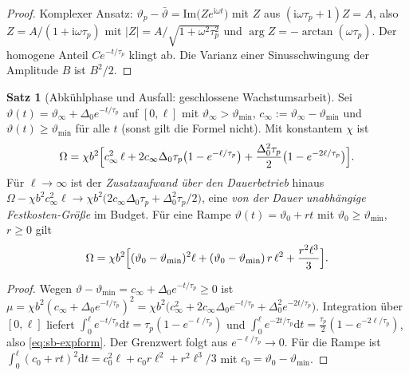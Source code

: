 \documentclass[a4paper, 12pt, twoside, openright]{report}
\theoremstyle{definition}
\theoremstyle{definition}
\newtheorem{satz}{Satz}[chapter]
\begin{document}
\begin{proof}
Komplexer Ansatz: $\vartheta_p-\bar\vartheta=\mathrm{Im}\bigl(Ze^{\mathrm i\omega t}\bigr)$ mit
$Z$ aus $(\mathrm i\omega\tau_p+1)Z=A$, also $Z=A/(1+\mathrm i\omega\tau_p)$ mit
$|Z|=A/\sqrt{1+\omega^2\tau_p^2}$ und $\arg Z=-\arctan(\omega\tau_p)$. Der homogene Anteil
$Ce^{-t/\tau_p}$ klingt ab. Die Varianz einer Sinusschwingung der Amplitude $B$ ist $B^2/2$.
\end{proof}

\begin{satz}[Abkühlphase und Ausfall: geschlossene Wachstumsarbeit]\label{satz:sb-exp}
Sei $\vartheta(t)=\vartheta_\infty+\Delta_0e^{-t/\tau_p}$ auf $[0,\ell]$ mit
$\vartheta_\infty>\vartheta_{\min}$, $c_\infty:=\vartheta_\infty-\vartheta_{\min}$ und
$\vartheta(t)\ge\vartheta_{\min}$ für alle $t$ (sonst gilt die Formel nicht). Mit konstantem
$\chi$ ist
\begin{equation}
  \Omega=\chi b^2\Bigl[c_\infty^2\,\ell+2c_\infty\Delta_0\tau_p\bigl(1-e^{-\ell/\tau_p}\bigr)
  +\frac{\Delta_0^2\tau_p}{2}\bigl(1-e^{-2\ell/\tau_p}\bigr)\Bigr].
  \label{eq:sb-expform}
\end{equation}
Für $\ell\to\infty$ ist der \emph{Zusatzaufwand über den Dauerbetrieb} hinaus
$\Omega-\chi b^2c_\infty^2\ell\to\chi b^2\bigl(2c_\infty\Delta_0\tau_p+\Delta_0^2\tau_p/2\bigr)$,
eine \emph{von der Dauer unabhängige Festkosten-Größe} im Budget. Für eine Rampe
$\vartheta(t)=\vartheta_0+rt$ mit $\vartheta_0\ge\vartheta_{\min}$, $r\ge0$ gilt
\begin{equation}
  \Omega=\chi b^2\Bigl[(\vartheta_0-\vartheta_{\min})^2\ell+(\vartheta_0-\vartheta_{\min})\,r\,\ell^2+\frac{r^2\ell^3}{3}\Bigr].
  \label{eq:sb-rampe}
\end{equation}
\end{satz}

\begin{proof}
Wegen $\vartheta-\vartheta_{\min}=c_\infty+\Delta_0e^{-t/\tau_p}\ge0$ ist
$\mu=\chi b^2(c_\infty+\Delta_0e^{-t/\tau_p})^2=\chi b^2\bigl(c_\infty^2+2c_\infty\Delta_0e^{-t/\tau_p}
+\Delta_0^2e^{-2t/\tau_p}\bigr)$. Integration über $[0,\ell]$ liefert
$\int_0^\ell e^{-t/\tau_p}\mathrm dt=\tau_p(1-e^{-\ell/\tau_p})$ und
$\int_0^\ell e^{-2t/\tau_p}\mathrm dt=\frac{\tau_p}2(1-e^{-2\ell/\tau_p})$, also
\eqref{eq:sb-expform}. Der Grenzwert folgt aus $e^{-\ell/\tau_p}\to0$. Für die Rampe ist
$\int_0^\ell(c_0+rt)^2\mathrm dt=c_0^2\ell+c_0r\ell^2+r^2\ell^3/3$ mit $c_0=\vartheta_0-\vartheta_{\min}$.
\end{proof}
\end{document}
